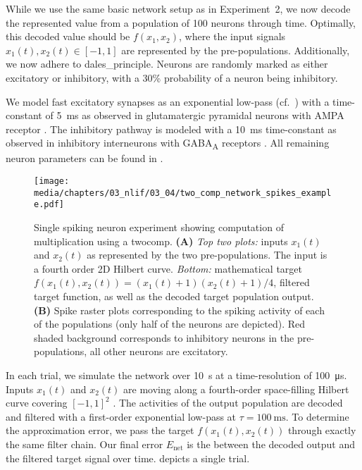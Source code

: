 While we use the same basic network setup as in Experiment~2, we now decode the represented value from a population of \num{100} neurons through time.
Optimally, this decoded value should be $f(x_1, x_2)$, where the input signals $x_1(t), x_2(t) \in [-1, 1]$ are represented by the pre-populations.
Additionally, we now adhere to \gls{dales_principle}.
Neurons are randomly marked as either excitatory or inhibitory, with a 30\% probability of a neuron being inhibitory.

We model fast excitatory synapses as an exponential low-pass (cf.~) with a time-constant of \SI{5}{\milli\second} as observed in glutamatergic pyramidal neurons with AMPA receptor \citep{jonas1993quantal}.
The inhibitory pathway is modeled with a \SI{10}{\milli\second} time-constant as observed in inhibitory interneurons with GABA\textsubscript{A} receptors \citep{gupta2000organizing}.
All remaining neuron parameters can be found in .


\begin{figure}
	\texttt{[image: media/chapters/03\_nlif/03\_04/two\_comp\_network\_spikes\_example.pdf]}
	\caption[Single spiking neuron experiment showing computation of multiplication using a two-compartment LIF neuron]{Single spiking neuron experiment showing computation of multiplication using a \gls{twocomp}.
	\textbf{(A)} \emph{Top two plots:} inputs $x_1(t)$ and $x_2(t)$ as represented by the two pre-populations. The input is a fourth order 2D Hilbert curve. \emph{Bottom:} mathematical target $f(x_1(t), x_2(t)) = (x_1(t) + 1) (x_2(t) + 1) / 4$, filtered target function, as well as the decoded target population output.
	\textbf{(B)} Spike raster plots corresponding to the spiking activity of each of the populations (only half of the neurons are depicted). Red shaded background corresponds to inhibitory neurons in the pre-populations, all other neurons are excitatory.}
	\label{fig:two_comp_lif_spiking_example}
\end{figure}

In each trial, we simulate the network over \SI{10}{\second} at a time-resolution of \SI{100}{\micro\second}.
Inputs $x_1(t)$ and $x_2(t)$ are moving along a fourth-order space-filling Hilbert curve covering $[-1, 1]^2$ \citep{hilbert1891uber}.
The activities of the output population are decoded and filtered with a first-order exponential low-pass at $\tau = \SI{100}{\milli\second}$.
To determine the approximation error, we pass the target $f(x_1(t), x_2(t))$ through exactly the same filter chain.
Our final error $E_\mathrm{net}$ is the \NRMSE between the decoded output and the filtered target signal over time.
 depicts a single trial.

